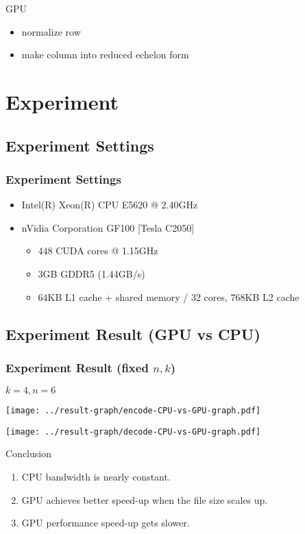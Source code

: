 \documentclass[slidestop,compress,mathserif]{beamer}
\begin{document}
\begin{frame}[options]
{
\begin{block}{GPU}
  \begin{itemize}
	\item normalize row
	\item make column into reduced echelon form
	\end{itemize}
\end{block}
}

\end{frame}

\section{Experiment} %
\subsection{Experiment Settings} %
\begin{frame}[options]
\frametitle{Experiment Settings}
\begin{itemize}
  \item Intel(R) Xeon(R) CPU E5620  @ 2.40GHz
  \item nVidia Corporation GF100 [Tesla C2050]
	\begin{itemize}
	  \item 448 CUDA cores @ 1.15GHz
	  \item 3GB GDDR5 (1.44GB/s)
	  \item 64KB L1 cache + shared memory / 32 cores, 768KB L2 cache
	\end{itemize}
\end{itemize}
\end{frame}
\subsection{Experiment Result (GPU vs CPU)} %
\begin{frame}[options]
\frametitle{Experiment Result (fixed $n,k$)}
{
$k = 4, n = 6$
}
{
\texttt{[image: ../result-graph/encode-CPU-vs-GPU-graph.pdf]}

}
{
\texttt{[image: ../result-graph/decode-CPU-vs-GPU-graph.pdf]}
}
{
\begin{block}{Conclusion}
\begin{enumerate}
\item CPU bandwidth is nearly constant.
\item GPU achieves better speed-up when the file size scales up.
\item GPU performance speed-up gets slower.
\end{enumerate}
\end{block}
}
\end{frame}
\end{document}
